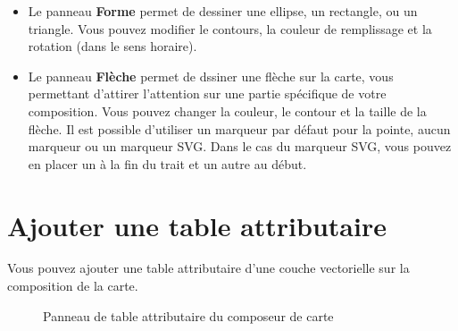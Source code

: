 \begin{itemize}[label=--]
\item Le panneau \textbf{Forme} permet de dessiner une ellipse, un rectangle, ou un triangle. Vous pouvez modifier le contours, la couleur de remplissage et la rotation (dans le sens horaire).
\item Le panneau  \textbf{Flèche} permet de dssiner une flèche sur la carte, vous permettant d'attirer l'attention sur une partie spécifique de votre composition. Vous pouvez changer la couleur, le contour et la taille de la flèche. Il est possible d'utiliser un marqueur par défaut pour la pointe, aucun marqueur ou un marqueur SVG. Dans le cas du marqueur SVG, vous pouvez en placer un à la fin du trait et un autre au début.
\end{itemize}

\section{Ajouter une table attributaire}

Vous pouvez ajouter une table attributaire d'une couche vectorielle sur la composition de la carte.

\begin{figure}[ht]
\centering
{}
\hspace{1cm}
\caption{Panneau de table attributaire du composeur de carte \nixcaption}\label{fig:attrcomp}
\end{figure}

